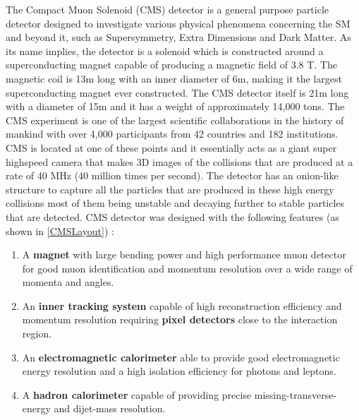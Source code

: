 
The Compact Muon Solenoid (CMS) detector is a general purpose particle detector designed to investigate various physical phenomena concerning the SM and beyond it, such as Supersymmetry, Extra Dimensions and Dark Matter. As its name implies, the detector is a solenoid which is  constructed around a superconducting magnet capable of producing a magnetic field of 3.8 T. The magnetic coil is 13m long with an inner diameter of 6m, making it the largest superconducting magnet ever constructed. The CMS detector itself is 21m long with a diameter of 15m and it has a weight of approximately 14,000 tons. The CMS experiment is one of the largest scientific collaborations in the history of mankind with over 4,000 participants from 42 countries and 182 institutions. CMS is located at one of these points and it essentially acts as a giant super highspeed camera that makes 3D images of the collisions that are produced at a rate of 40 MHz (40 million times per second). The detector has an onion-like structure to capture all the particles that are produced in these high energy collisions most of them being unstable and decaying further to stable particles that are detected.  CMS detector was designed with the following features (as shown in \autoref{CMSLayout}) :

\begin{enumerate}
	\item{A \textbf{magnet} with large bending power and high performance muon detector for good muon
identification and momentum resolution over a wide range of momenta and angles.}

	\item{An \textbf{inner tracking system} capable of high reconstruction efficiency and momentum resolution
requiring \textbf{pixel detectors} close to the interaction region.}

	\item{An \textbf{electromagnetic calorimeter} able to provide good electromagnetic energy resolution and  
a high isolation efficiency for photons and leptons.}

	\item{A \textbf{hadron calorimeter} capable of providing precise missing-transverse-energy and dijet-mass  
resolution.}

\end{enumerate}

